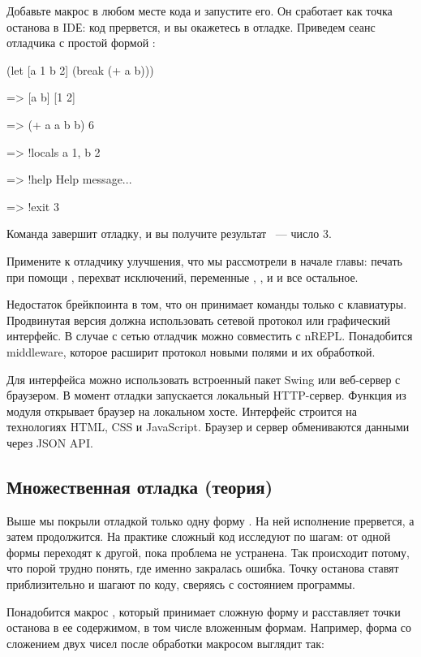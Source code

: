 Добавьте макрос  в любом месте кода и запустите его. Он сработает как точка останова в IDЕ: код прервется, и вы окажетесь в отладке. Приведем сеанс отладчика с простой формой :

\begin{english}
  \begin{clojure}
(let [a 1 b 2]
  (break (+ a b)))

=> [a b]
[1 2]

=> (+ a a b b)
6

=> !locals
{a 1, b 2}

=> !help
Help message...

=> !exit
3
  \end{clojure}
\end{english}

Команда  завершит отладку, и вы получите результат ~--- число 3.

Примените к отладчику улучшения, что мы рассмотрели в начале главы: печать при помощи , перехват исключений, переменные , ,  и  и все остальное.

Недостаток брейкпоинта в том, что он принимает команды только с клавиатуры. Продвинутая версия должна использовать сетевой протокол или графический интерфейс. В случае с сетью отладчик можно совместить с nREPL. Понадобится middleware, которое расширит протокол новыми полями и их обработкой.

Для интерфейса можно использовать встроенный пакет Swing или веб-сервер с браузером. В момент отладки запускается локальный HTTP-сервер. Функция  из модуля  открывает браузер на локальном хосте. Интерфейс строится на технологиях HTML, CSS и JavaScript. Браузер и сервер обмениваются данными через JSON API.

\subsection{Множественная отладка (теория)}

Выше мы покрыли отладкой только одну форму . На ней исполнение прервется, а затем продолжится. На практике сложный код исследуют по шагам: от одной формы переходят к другой, пока проблема не устранена. Так происходит потому, что порой трудно понять, где именно закралась ошибка. Точку останова ставят приблизительно и шагают по коду, сверяясь с состоянием программы.

Понадобится макрос , который принимает сложную форму и расставляет точки останова в ее содержимом, в том числе вложенным формам. Например, форма  со сложением двух чисел после обработки макросом выглядит так:

